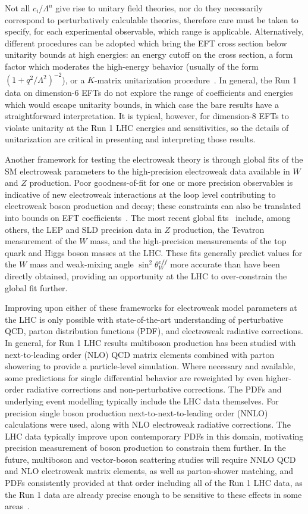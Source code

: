 Not all $c_i/\Lambda^n$ give rise to unitary field theories, nor do
they necessarily correspond to perturbatively calculable theories,
therefore care must be taken to specify, for each experimental
observable, which range is applicable.  Alternatively, different
procedures can be adopted which bring the EFT cross section below
unitarity bounds at high energies: an energy cutoff on the cross
section, a form factor which moderates the high-energy behavior
(usually of the form $(1+q^2/\Lambda^2)^{-2}$), or a $K$-matrix
unitarization procedure~\cite{Alboteanu:2008my,Chung:1995dx}.  In
general, the Run 1 data on dimension-6 EFTs do not explore the range
of coefficients and energies which would escape unitarity bounds, in
which case the bare results have a straightforward interpretation.  It
is typical, however, for dimension-8 EFTs to violate unitarity at the
Run 1 LHC energies and sensitivities, so the details of unitarization
are critical in presenting and interpreting those results.

Another framework for testing the electroweak theory is through global
fits of the SM electroweak parameters to the high-precision
electroweak data available in $W$ and $Z$ production.  Poor
goodness-of-fit for one or more precision observables is indicative of
new electroweak interactions at the loop level contributing to
electroweak boson production and decay; these constraints can also be
translated into bounds on EFT coefficients~\cite{Falkowski:2014tna}.
The most recent global fits~\cite{Baak:2014ora,Ciuchini:2013pca}
include, among others, the LEP and SLD precision data in $Z$
production, the Tevatron measurement of the $W$ mass, and the
high-precision measurements of the top quark and Higgs boson masses at
the LHC.  These fits generally predict values for the $W$ mass and
weak-mixing angle $\sin^2\theta^{eff}_{W}$ more accurate than have
been directly obtained, providing an opportunity at the LHC to
over-constrain the global fit further.

Improving upon either of these frameworks for electroweak model
parameters at the LHC is only possible with state-of-the-art
understanding of perturbative QCD, parton distribution functions
(PDF), and electroweak radiative corrections.  In general, for Run 1
LHC results multiboson production has been studied with
next-to-leading order (NLO) QCD matrix elements combined with parton
showering to provide a particle-level simulation.  Where necessary and
available, some predictions for single differential behavior are
reweighted by even higher-order radiative corrections and
non-perturbative corrections. The PDFs and underlying event modelling
typically include the LHC data themselves.  For precision single boson
production next-to-next-to-leading order (NNLO) calculations were
used, along with NLO electroweak radiative corrections.  The LHC data
typically improve upon contemporary PDFs in this domain, motivating
precision measurement of boson production to constrain them further.
In the future, multiboson and vector-boson scattering studies will
require NNLO QCD and NLO electroweak matrix elements, as well as
parton-shower matching, and PDFs consistently provided at that order
including all of the Run 1 LHC data, as the Run 1 data are already
precise enough to be sensitive to these effects in some
areas~\cite{Badger:2016bpw}.
